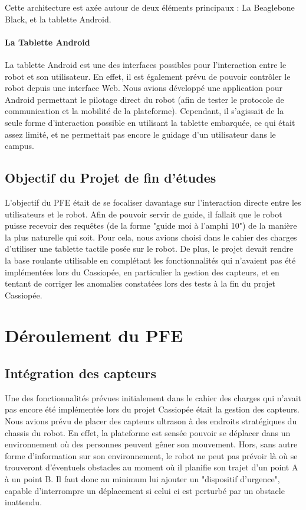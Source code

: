 \documentclass{report}
\begin{document}
    {Cette architecture est axée autour de deux éléments principaux :
    La Beaglebone Black, et la tablette Android.}

    \subsubsection{La Tablette Android}

    {La tablette Android est une des interfaces possibles pour l'interaction entre le robot
    et son utilisateur. En effet, il est également prévu de pouvoir contrôler le robot
    depuis une interface Web. Nous avions développé une application pour Android
    permettant le pilotage direct du robot (afin de tester le protocole de communication
    et la mobilité de la plateforme). Cependant, il s'agissait de la seule forme d'interaction
    possible en utilisant la tablette embarquée, ce qui était assez limité, et ne permettait
     pas encore le guidage d'un utilisateur dans le campus.}


    \section{Objectif du Projet de fin d'études}

    {L'objectif du PFE était de se focaliser davantage sur l'interaction directe
     entre les utilisateurs et le robot. Afin de pouvoir servir de guide, il
     fallait que le robot puisse recevoir des requêtes (de la forme "guide
     moi à l'amphi 10") de la manière la plus naturelle qui soit. Pour cela,
     nous avions choisi dans le cahier des charges d'utiliser une tablette
     tactile posée sur le robot. De plus, le projet devait rendre la base
     roulante utilisable en complétant les fonctionnalités qui n'avaient pas
     été implémentées lors du Cassiopée, en particulier la gestion des capteurs,
     et en tentant de corriger les anomalies constatées lors des tests à la fin
     du projet Cassiopée.}



  \chapter{Déroulement du PFE}

    \section{Intégration des capteurs}

    {Une des fonctionnalités prévues initialement dans le cahier des charges qui n'avait
    pas encore été implémentée lors du projet Cassiopée était la gestion des capteurs.
    Nous avions prévu de placer des capteurs ultrason à des endroits stratégiques du
    chassis du robot. En effet, la plateforme est sensée pouvoir se déplacer
    dans un environnement où des personnes peuvent gêner son mouvement. Hors, sans
    autre forme d'information sur son environnement, le robot ne peut pas prévoir
    là où se trouveront d'éventuels obstacles au moment où il planifie son trajet d'un
    point A à un point B. Il faut donc au minimum lui ajouter un "dispositif d'urgence",
    capable d'interrompre un déplacement si celui ci est perturbé par un obstacle
    inattendu.}
\end{document}
